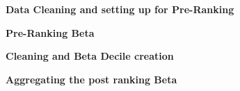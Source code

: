 \textbf{Data Cleaning and setting up for Pre-Ranking}

\textbf{Pre-Ranking Beta}

\textbf{Cleaning and Beta Decile creation}

\textbf{Aggregating the post ranking Beta}
\
